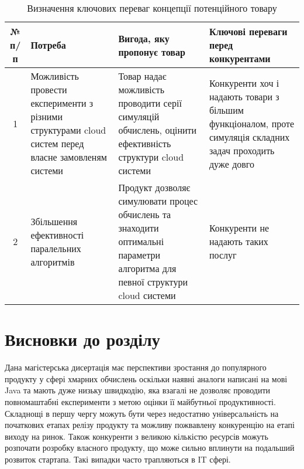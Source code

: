 \begin{table}[H]
	\centering
	\caption{Визначення ключових переваг концепції потенційного товару}
	\begin{tabular}{|c|p{4cm}|p{4cm}|p{4cm}|} \hline
		№ п/п
		& Потреба
		& Вигода, яку пропонує товар
		& Ключові переваги перед конкурентами 
		\\ \hline
		
		1
		& Можливість провести експерименти з різними структурами cloud систем перед власне замовленям системи 
		& Товар надає можливість проводити серії симуляцій обчислень, оцінити ефективність структури cloud системи
		& Конкуренти хоч і надають товари з більшим функціоналом, проте симуляція складних задач проходить дуже довго
		\\ \hline
		
		2
		& Збільшення ефективності паралельних алгоритмів
		& Продукт дозволяє симулювати процес обчислень та знаходити оптимальні параметри алгоритма для певної структури cloud системи
		& Конкуренти не надають таких послуг
		\\ \hline
	\end{tabular}
\end{table}



\section*{Висновки до розділу}

Дана магістерська дисертація має перспективи зростання до популярного продукту у сфері хмарних обчислень оскільки наявні аналоги написані на мові Java та мають дуже низьку швидкодію, яка взагалі не дозволяє проводити повномаштабні експерименти з метою оцінки її майбутньої продуктивності. Складнощі в першу чергу можуть бути через недостатню універсальність на початкових етапах релізу продукту та можливу пожвавлену конкуренцію на етапі виходу на ринок. Також конкуренти з великою кількістю ресурсів можуть розпочати розробку власного продукту, що може сильно вплинути на подальший розвиток стартапа. Такі випадки часто трапляються в IT сфері.
\hspace{10pt}

